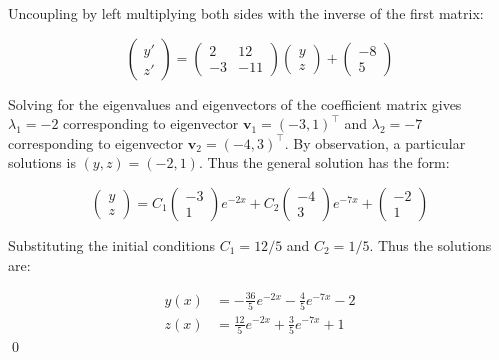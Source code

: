 \documentclass[12pt]{article}
\begin{document}
Uncoupling by left multiplying both sides with the inverse of the first matrix:

\begin{equation}
    \begin{pmatrix}
        y' \\
        z'
    \end{pmatrix}
    =
    \begin{pmatrix}
        2  & 12  \\
        -3 & -11
    \end{pmatrix}
    \begin{pmatrix}
        y \\
        z
    \end{pmatrix}
    +
    \begin{pmatrix}
        -8 \\
        5
    \end{pmatrix}
\end{equation}

Solving for the eigenvalues and eigenvectors of the coefficient matrix gives $\lambda_{1} = -2$ corresponding to eigenvector $\mathbf{v}_{1} = (-3, 1)^{\intercal}$ and $\lambda_{2} = -7$ corresponding to eigenvector $\mathbf{v}_{2} = (-4, 3)^{\intercal}$. By observation, a particular solutions is $(y, z) = (-2, 1)$. Thus the general solution has the form:

\begin{equation}
    \begin{pmatrix}
        y \\
        z
    \end{pmatrix}
    =
    C_{1} \begin{pmatrix}
        -3 \\
        1
    \end{pmatrix}
    e^{-2x}
    +
    C_{2} \begin{pmatrix}
        -4 \\
        3
    \end{pmatrix}
    e^{-7x}
    +
    \begin{pmatrix}
        -2 \\
        1
    \end{pmatrix}
\end{equation}

Substituting the initial conditions $C_{1} = 12/5$ and $C_{2} = 1/5$. Thus the solutions are:

\begin{equation}
    \begin{split}
        y(x) &= -\frac{36}{5} e^{-2x} - \frac{4}{5} e^{-7x} - 2 \\
        z(x) &= \frac{12}{5} e^{-2x} + \frac{3}{5} e^{-7x} + 1
    \end{split}
\end{equation}
\qed
\end{document}

